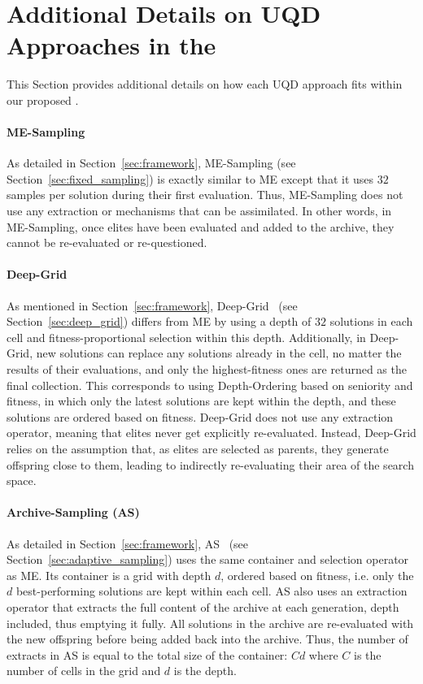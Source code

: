 
\section{Additional Details on UQD Approaches in the \framework{}} \label{app:framework}

This Section provides additional details on how each UQD approach fits within our proposed \framework{}. 

\paragraph{ME-Sampling}
As detailed in Section~\ref{sec:framework}, ME-Sampling (see Section~\ref{sec:fixed_sampling}) is exactly similar to ME except that it uses $32$ samples per solution during their first evaluation. Thus, ME-Sampling does not use any extraction or mechanisms that can be assimilated. In other words, in ME-Sampling, once elites have been evaluated and added to the archive, they cannot be re-evaluated or re-questioned.


\paragraph{Deep-Grid}
As mentioned in Section~\ref{sec:framework}, Deep-Grid~\cite{flageat2020fast} (see Section~\ref{sec:deep_grid}) differs from ME by using a depth of $32$ solutions in each cell and fitness-proportional selection within this depth.
Additionally, in Deep-Grid, new solutions can replace any solutions already in the cell, no matter the results of their evaluations, and only the highest-fitness ones are returned as the final collection.
This corresponds to using Depth-Ordering based on seniority and fitness, in which only the latest solutions are kept within the depth, and these solutions are ordered based on fitness.
Deep-Grid does not use any extraction operator, meaning that elites never get explicitly re-evaluated. Instead, Deep-Grid relies on the assumption that, as elites are selected as parents, they generate offspring close to them, leading to indirectly re-evaluating their area of the search space. 


\paragraph{Archive-Sampling (AS)}
As detailed in Section~\ref{sec:framework}, AS~\cite{flageat2023uncertain} (see Section~\ref{sec:adaptive_sampling}) uses the same container and selection operator as ME. Its container is a grid with depth $d$, ordered based on fitness, i.e. only the $d$ best-performing solutions are kept within each cell. AS also uses an extraction operator that extracts the full content of the archive at each generation, depth included, thus emptying it fully. All solutions in the archive are re-evaluated with the new offspring before being added back into the archive. Thus, the number of extracts in AS is equal to the total size of the container: $Cd$ where $C$ is the number of cells in the grid and $d$ is the depth.


